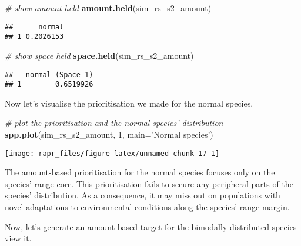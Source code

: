 \documentclass[11pt,]{article}
\newenvironment{Shaded}{\begin{snugshade}}{\end{snugshade}}
\newcommand{\KeywordTok}[1]{\textcolor[rgb]{0.13,0.29,0.53}{\textbf{{#1}}}}
\newcommand{\DataTypeTok}[1]{\textcolor[rgb]{0.13,0.29,0.53}{{#1}}}
\newcommand{\DecValTok}[1]{\textcolor[rgb]{0.00,0.00,0.81}{{#1}}}
\newcommand{\StringTok}[1]{\textcolor[rgb]{0.31,0.60,0.02}{{#1}}}
\newcommand{\CommentTok}[1]{\textcolor[rgb]{0.56,0.35,0.01}{\textit{{#1}}}}
\newcommand{\NormalTok}[1]{{#1}}
\let\origfigure\figure
\let\endorigfigure\endfigure
\renewenvironment{figure}[1][2] {
	\expandafter\origfigure\expandafter[H]
} {
	\endorigfigure
}
\begin{document}
\begin{Shaded}
\begin{Highlighting}[]
\CommentTok{# show amount held}
\KeywordTok{amount.held}\NormalTok{(sim_rs_s2_amount)}
\end{Highlighting}
\end{Shaded}

\begin{verbatim}
##      normal
## 1 0.2026153
\end{verbatim}

\begin{Shaded}
\begin{Highlighting}[]
\CommentTok{# show space held}
\KeywordTok{space.held}\NormalTok{(sim_rs_s2_amount)}
\end{Highlighting}
\end{Shaded}

\begin{verbatim}
##   normal (Space 1)
## 1        0.6519926
\end{verbatim}

Now let's visualise the prioritisation we made for the normal species.

\begin{Shaded}
\begin{Highlighting}[]
\CommentTok{# plot the prioritisation and the normal species' distribution}
\KeywordTok{spp.plot}\NormalTok{(sim_rs_s2_amount, }\DecValTok{1}\NormalTok{, }\DataTypeTok{main=}\StringTok{'Normal species'}\NormalTok{)}
\end{Highlighting}
\end{Shaded}

\begin{figure}

{\centering \texttt{[image: rapr\_files/figure-latex/unnamed-chunk-17-1]} 

}

\caption{A prioritisation for the normally distributed species generated using amount-based targets (20\%). See Figure 3 caption for conventions.}\label{fig:unnamed-chunk-17}
\end{figure}

The amount-based prioritisation for the normal species focuses only on
the species' range core. This prioritisation fails to secure any
peripheral parts of the species' distribution. As a consequence, it may
miss out on populations with novel adaptations to environmental
conditions along the species' range margin.

Now, let's generate an amount-based target for the bimodally distributed
species view it.
\end{document}
